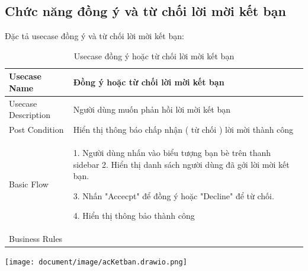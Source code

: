 \subsection{Chức năng đồng ý và từ chối lời mời kết bạn}
Đặc tả usecase đồng ý và từ chối lời mời kết bạn: 
\begin{table}[H]
    \centering
	\begin{tabular}{|p{5cm}|p{10cm}|}
    
    \hline
    Usecase Name&Đồng ý hoặc từ chối lời mời kết bạn\\
    \hline
    Usecase Description&Người dùng muốn phản hồi lời mời kết bạn\\
    \hline
    Post Condition&Hiển thị thông báo chấp nhận ( từ chối ) lời mời thành công \\
    \hline
    Basic Flow& 1. Người dùng nhấn vào biểu tượng bạn bè trên thanh sidebar
    2. Hiển thị danh sách người dùng đã gởi lời mời kết bạn.
    
    3. Nhấn "Accecpt" để đồng ý hoặc "Decline" để từ chối.
    
    4. Hiển thị thông bảo thành công\\
    

    \hline Business Rules& \\
   
   
	\hline
\end{tabular}
\caption{Usecase đồng ý hoặc từ chối lời mời kết bạn}
\end{table}
 \begin{center}
  \captionsetup{type=figure}
  \texttt{[image: document/image/acKetban.drawio.png]}
\end{center}

